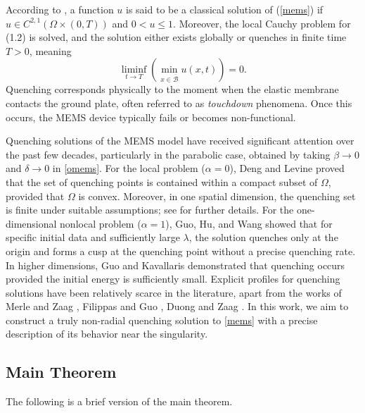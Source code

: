 \documentclass[11pt,reqno]{amsart}
\theoremstyle{definition}
\theoremstyle{bfremark}
\numberwithin{equation}{section}
\begin{document}
According to \cite{kavallaris2018non}, a function \(u\) is said to be a classical solution of (\ref{mems}) if \( u \in C^{2,1}(\Omega \times (0,T)) \) and \(0<u \leq 1\). Moreover, the local Cauchy problem for (1.2) is solved, and the solution either exists globally or quenches in finite time \( T > 0 \), meaning
\[
\liminf_{t \to T} \left( \min_{x \in \overline{\mathcal{B}}} u(x,t) \right) = 0.
\]
Quenching corresponds physically to the moment when the elastic membrane contacts the ground plate, often referred to as \emph{touchdown} phenomena. Once this occurs, the MEMS device typically fails or becomes non-functional.

Quenching solutions of the MEMS model have received significant attention over the past few decades, particularly in the parabolic case, obtained by taking \(\beta \to 0\) and \(\delta \to 0\) in \eqref{omems}. For the local problem (\(\alpha=0\)), Deng and Levine \cite{deng1989blow} proved that the set of quenching points is contained within a compact subset of \(\Omega\), provided that \(\Omega\) is convex. Moreover, in one spatial dimension, the quenching set is finite under suitable assumptions; see \cite{GUO1992507} for further details. For the one-dimensional nonlocal problem (\(\alpha=1\)), Guo, Hu, and Wang \cite{guo2009nonlocal} showed that for specific initial data and sufficiently large \(\lambda\), the solution quenches only at the origin and forms a cusp at the quenching point without a precise quenching rate. In higher dimensions, Guo and Kavallaris \cite{guo2012nonlocal} demonstrated that quenching occurs provided the initial energy is sufficiently small. Explicit profiles for quenching solutions have been relatively scarce in the literature, apart from the works of Merle and Zaag \cite{merle1997reconnection}, Filippas and Guo \cite{filippas1993quenching}, Duong and Zaag \cite{duong2018construction}. In this work, we aim to construct a truly non-radial quenching solution to \eqref{mems} with a precise description of its behavior near the singularity.


\subsection{Main Theorem}
The following is a brief version of the main theorem. 
\end{document}
